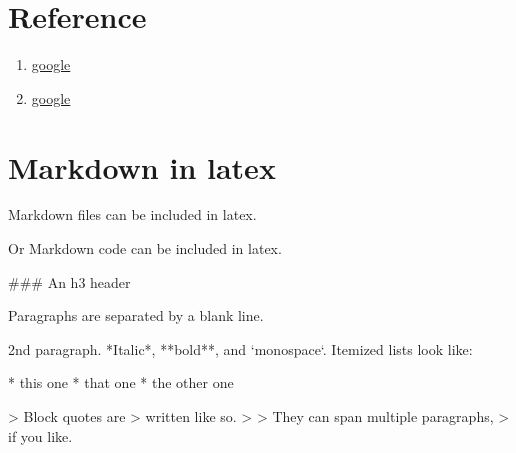 \section{Reference}

\begin{enumerate}
  \item \href{https://www.google.com/}{google}
  \item \href{https://www.google.com/}{google}
\end{enumerate}

\section{Markdown in latex}%
\label{sec:markdown_in_latex}
Markdown files can be included in latex. \\



Or Markdown code can be included in latex. \\

\begin{markdown}
### An h3 header

Paragraphs are separated by a blank line.

2nd paragraph. *Italic*, **bold**, and `monospace`. Itemized lists
look like:

* this one
* that one
* the other one

> Block quotes are
> written like so.
>
> They can span multiple paragraphs,
> if you like.

\end{markdown}
